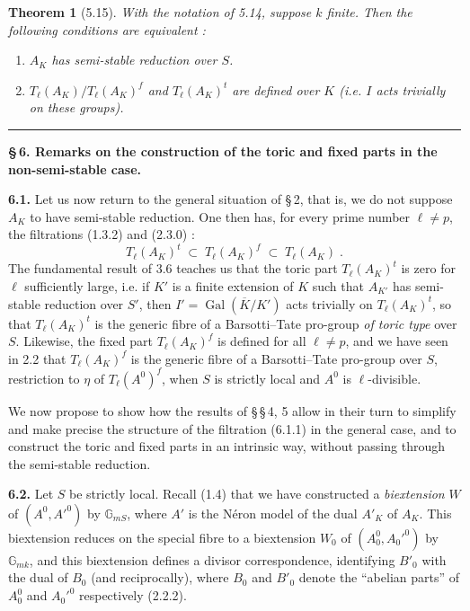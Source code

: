 \documentclass[11pt]{article}
\newtheorem{theoreme}[proposition]{Theorem}
\newcommand{\GG}{\mathbb G}
\newcommand{\Tl}{T_{\ell}}
\newcommand{\Gal}{\operatorname{Gal}}
\begin{document}
\begin{theoreme}[5.15]
With the notation of \emph{5.14}, suppose $k$ finite. Then the
following conditions are equivalent :
\begin{enumerate}[label=\emph{(\roman*)}]
\item $A_K$ has \emph{semi-stable reduction} over $S$.
\item $\Tl(A_K)/\Tl(A_K)^f$ and $\Tl(A_K)^t$ are defined over $K$
(i.e. $I$ acts trivially on these groups).
\end{enumerate}
\end{theoreme}


\newpage
\hrule
\medskip

\noindent\textbf{\large \S\,6. Remarks on the construction of the toric
and fixed parts in the non-semi-stable case.}

\smallskip

\noindent\textbf{6.1.} Let us now return to the general situation of
\S\,2, that is, we do not suppose $A_K$ to have semi-stable reduction.
One then has, for every prime number $\ell \neq p$, the filtrations
(1.3.2) and (2.3.0) :
\begin{equation}
\Tl(A_K)^t \;\subset\; \Tl(A_K)^f \;\subset\; \Tl(A_K) \; .
\end{equation}
The fundamental result of 3.6 teaches us that the toric part
$\Tl(A_K)^t$ is zero for $\ell$ sufficiently large, i.e. if $K'$ is a
finite extension of $K$ such that $A_{K'}$ has semi-stable reduction
over $S'$, then $I' = \Gal(\overline{K}/K')$ acts trivially on
$\Tl(A_K)^t$, so that $\Tl(A_K)^t$ is the generic fibre of a
Barsotti--Tate pro-group \emph{of toric type} over $S$. Likewise, the
fixed part $\Tl(A_K)^f$ is defined for all $\ell \neq p$, and we have
seen in 2.2 that $\Tl(A_K)^f$ is the generic fibre of a Barsotti--Tate
pro-group over $S$, restriction to $\eta$ of $\Tl(A^0)^f$, when $S$ is
strictly local and $A^0$ is $\ell$-divisible.

\smallskip

We now propose to show how the results of \S\,\S\,4, 5 allow in their
turn to simplify and make precise the structure of the filtration
(6.1.1) in the general case, and to construct the toric and fixed
parts in an intrinsic way, without passing through the semi-stable
reduction.

\medskip

\noindent\textbf{6.2.} Let $S$ be strictly local. Recall (1.4) that we
have constructed a \emph{biextension} $W$ of $(A^0, A'^0)$ by
$\GG_{mS}$, where $A'$ is the N\'eron model of the dual $A'_K$ of
$A_K$. This biextension reduces on the special fibre to a biextension
$W_0$ of $(A_0^0, A_0'^0)$ by $\GG_{mk}$, and this biextension defines a
divisor correspondence, identifying $B'_0$ with the dual of $B_0$ (and
reciprocally), where $B_0$ and $B'_0$ denote the ``abelian parts'' of
$A_0^0$ and $A_0'^0$ respectively (2.2.2).
\end{document}
